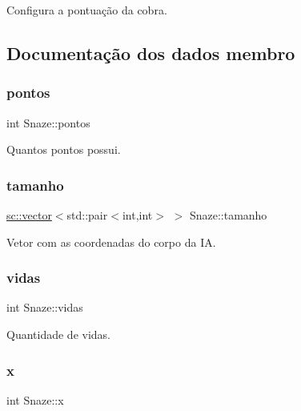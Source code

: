 Configura a pontuação da cobra. 



\subsection{Documentação dos dados membro}
\mbox{\label{classSnaze_ac1c892159efbc10b5e84cd4eb8107e7c}} 
\subsubsection{\texorpdfstring{pontos}{pontos}}
{\footnotesize\ttfamily int Snaze\+::pontos\hspace{0.3cm}{\ttfamily [private]}}



Quantos pontos possui. 

\mbox{\label{classSnaze_a4419e9300564766a252510d81c6c3827}} 
\subsubsection{\texorpdfstring{tamanho}{tamanho}}
{\footnotesize\ttfamily \hyperlink{classsc_1_1vector}{sc\+::vector}$<$std\+::pair$<$int,int$>$ $>$ Snaze\+::tamanho\hspace{0.3cm}{\ttfamily [private]}}



Vetor com as coordenadas do corpo da IA. 

\mbox{\label{classSnaze_ac561e4dd85557cf710c1ddbe51b6517f}} 
\subsubsection{\texorpdfstring{vidas}{vidas}}
{\footnotesize\ttfamily int Snaze\+::vidas\hspace{0.3cm}{\ttfamily [private]}}



Quantidade de vidas. 

\mbox{\label{classSnaze_a437683faf08157e2c1e549c3ea1de441}} 
\subsubsection{\texorpdfstring{x}{x}}
{\footnotesize\ttfamily int Snaze\+::x\hspace{0.3cm}{\ttfamily [private]}}



